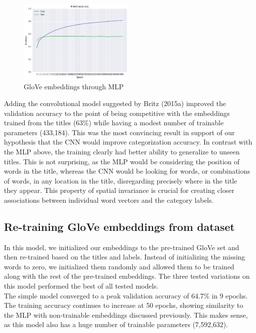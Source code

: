 \documentclass[jou,apacite, 10px]{apa6}
\begin{document}
\begin{figure}[h!]
\captionsetup{justification=centering}
    \centering
     \includegraphics[width=0.5\textwidth]{images/Training-GloveMLP}
        \caption{GloVe embeddings through MLP}
\end{figure}

Adding the convolutional model suggested by Britz (2015a) improved the validation accuracy to the point of being competitive with the embeddings trained from the titles (63\%) while having a modest number of trainable parameters (433,184). This was the most convincing result in support of our hypothesis that the CNN would improve categorization accuracy. In contrast with the MLP above, the training clearly had better ability to generalize to unseen titles. This is not surprising, as the MLP would be considering the position of words in the title, whereas the CNN would be looking for words, or combinations of words, in any location in the title, disregarding precisely where in the title they appear. This property of spatial invariance is crucial for creating closer associations between individual word vectors and the category labels.

\subsection{Re-training GloVe embeddings from dataset}
In this model, we initialized our embeddings to the pre-trained GloVe set and then re-trained based on the titles and labels. Instead of initializing the missing words to zero, we initialized them randomly and allowed them to be trained along with the rest of the pre-trained embeddings. The three tested variations on this model performed the best of all tested models.\\

The simple model converged to a peak validation accuracy of 64.7\% in 9 epochs. The training accuracy continues to increase at 50 epochs, showing similarity to the MLP with non-trainable embeddings discussed previously. This makes sense, as this model also has a huge number of trainable parameters (7,592,632).\\
\end{document}
